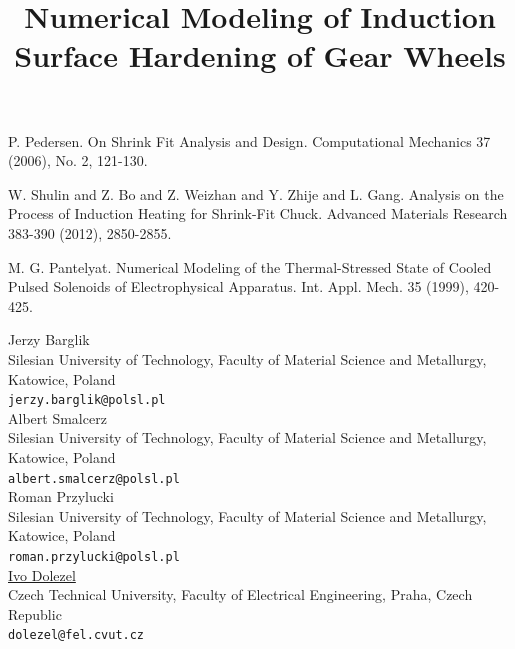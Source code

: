 \documentclass[article,A4,11pt]{llncs}%
\begin{document}

\begin{thebibliography}{10}
{\sc P. Pedersen}. {On Shrink Fit Analysis and Design}. Computational Mechanics 37 (2006), No. 2, 121-130.

{\sc W. Shulin and Z. Bo and Z. Weizhan and Y. Zhije and L. Gang}. {Analysis on the Process of Induction Heating for Shrink-Fit Chuck}. Advanced Materials Research 383-390 (2012), 2850-2855.

{\sc M. G. Pantelyat}. {Numerical Modeling of the Thermal-Stressed State of Cooled Pulsed Solenoids of Electrophysical Apparatus}. Int. Appl. Mech. 35 (1999), 420-425.
\end{thebibliography}

\title{Numerical Modeling of Induction Surface Hardening of Gear Wheels}
 \author{} \institute{}
\maketitle
\begin{center}
{\large Jerzy Barglik}\\
Silesian University of Technology, Faculty of Material Science and Metallurgy, Katowice, Poland\\
{\tt jerzy.barglik@polsl.pl}
\\ \vspace{4mm}
{\large Albert  Smalcerz}\\
Silesian University of Technology, Faculty of Material Science and Metallurgy, Katowice, Poland\\
{\tt albert.smalcerz@polsl.pl}
\\ \vspace{4mm}
{\large Roman Przylucki}\\
Silesian University of Technology, Faculty of Material Science and Metallurgy, Katowice, Poland\\
{\tt roman.przylucki@polsl.pl}
\\ \vspace{4mm}
{\large \underline{Ivo Dolezel}}\\
Czech Technical University, Faculty of Electrical Engineering, Praha, Czech Republic\\
{\tt dolezel@fel.cvut.cz}
\end{center}
\end{document}
